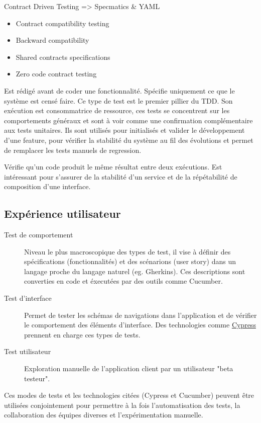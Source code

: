 \documentclass[a4paper,12pt]{article}
\begin{document}
\begin{multicols}{2}
\begin{description}
\item Contract Driven Testing 
=> Specmatics \& YAML
\begin{itemize}
\item Contract compatibility testing
\item Backward compatibility
\item Shared contracts specifications
\item Zero code contract testing
\end{itemize}
\item[{Test d'acceptation}] Est rédigé avant de coder une fonctionnalité. Spécifie uniquement ce que le système est censé faire. Ce type de test est le premier pillier du TDD. Son exécution est consommatrice de ressource, ces tests se concentrent sur les comportements généraux et sont à voir comme une confirmation complémentaire aux tests unitaires. Ils sont utilisés pour initialisés et valider le développement d'une feature, pour vérifier la stabilité du système au fil des évolutions et permet de remplacer les tests manuels de regression.
\item[{Test d'approbation}] Vérifie qu'un code produit le même résultat entre deux exécutions. Est intéressant pour s'assurer de la stabilité d'un service et de la répétabilité de composition d'une interface.
\end{description}
\subsection*{Expérience utilisateur}
\label{sec:org7055eb5}
\begin{description}
\item[{Test de comportement}] Niveau le plus macroscopique des types de test, il vise à définir des spécifications (fonctionnalités) et des scénarions (user story) dans un langage proche du langage naturel (eg. Gherkins). Ces descriptions sont converties en code et éxecutées par des outils comme Cucumber.
\item[{Test d'interface}] Permet de tester les schémas de navigations dans l'application et de vérifier le comportement des éléments d'interface. Des technologies comme \href{https://www.cypress.io/}{Cypress} prennent en charge ces types de tests.
\item[{Test utilisateur}] Exploration manuelle de l'application client par un utilisateur "beta testeur".
\end{description}

Ces modes de tests et les technologies citées (Cypress et Cucumber) peuvent être utilisées conjointement pour permettre à la fois l'automatisation des tests, la collaboration des équipes diverses et l'expérimentation manuelle.

\end{multicols}
\end{document}
